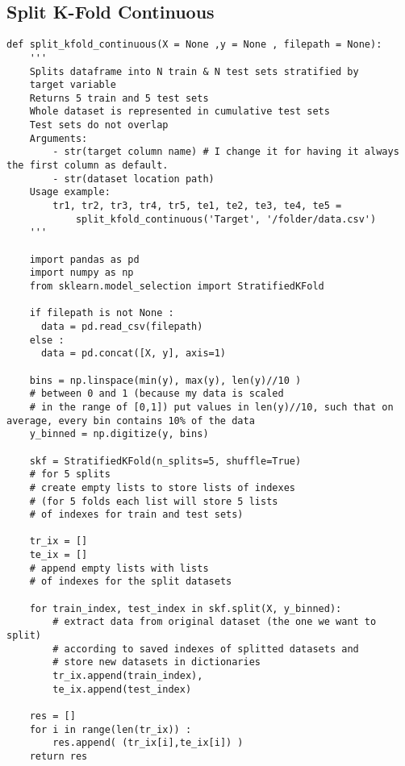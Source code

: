 \subsection{Split K-Fold Continuous}
\begin{Verbatim}[fontsize=\tiny]
def split_kfold_continuous(X = None ,y = None , filepath = None):
    '''
    Splits dataframe into N train & N test sets stratified by
    target variable
    Returns 5 train and 5 test sets
    Whole dataset is represented in cumulative test sets
    Test sets do not overlap
    Arguments:
        - str(target column name) # I change it for having it always the first column as default.
        - str(dataset location path)
    Usage example:
        tr1, tr2, tr3, tr4, tr5, te1, te2, te3, te4, te5 =
            split_kfold_continuous('Target', '/folder/data.csv')
    '''

    import pandas as pd
    import numpy as np
    from sklearn.model_selection import StratifiedKFold

    if filepath is not None :
      data = pd.read_csv(filepath)
    else : 
      data = pd.concat([X, y], axis=1)
      
    bins = np.linspace(min(y), max(y), len(y)//10 )
    # between 0 and 1 (because my data is scaled
    # in the range of [0,1]) put values in len(y)//10, such that on average, every bin contains 10% of the data
    y_binned = np.digitize(y, bins)

    skf = StratifiedKFold(n_splits=5, shuffle=True)
    # for 5 splits
    # create empty lists to store lists of indexes
    # (for 5 folds each list will store 5 lists
    # of indexes for train and test sets)

    tr_ix = []
    te_ix = []
    # append empty lists with lists
    # of indexes for the split datasets

    for train_index, test_index in skf.split(X, y_binned):
        # extract data from original dataset (the one we want to split)
        # according to saved indexes of splitted datasets and
        # store new datasets in dictionaries
        tr_ix.append(train_index),
        te_ix.append(test_index)

    res = []
    for i in range(len(tr_ix)) :
        res.append( (tr_ix[i],te_ix[i]) )
    return res
\end{Verbatim}



